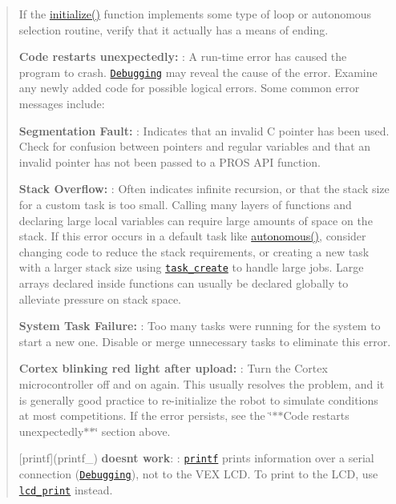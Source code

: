\begin{quote}
\begin{DoxyItemize}
If the {\ttfamily \hyperlink{main_8h_a9efe22aaead3a5e936b5df459de02eba}{initialize()}} function implements some type of loop or autonomous selection routine, verify that it actually has a means of ending.
\item {\bfseries Code restarts unexpectedly\+:} \+: A run-\/time error has caused the program to crash. \href{./debugging}{\tt Debugging} may reveal the cause of the error. Examine any newly added code for possible logical errors. Some common error messages include\+:
\begin{DoxyItemize}
\item {\bfseries Segmentation Fault\+:} \+: Indicates that an invalid C pointer has been used. Check for confusion between pointers and regular variables and that an invalid pointer has not been passed to a P\+R\+OS A\+PI function.
\item {\bfseries Stack Overflow\+:} \+: Often indicates infinite recursion, or that the stack size for a custom task is too small. Calling many layers of functions and declaring large local variables can require large amounts of space on the stack. If this error occurs in a default task like {\ttfamily \hyperlink{main_8h_a2df3d06bc5bced154da27fce393f991f}{autonomous()}}, consider changing code to reduce the stack requirements, or creating a new task with a larger stack size using \href{../../api/c/rtos.html#task_create}{\tt task\+\_\+create} to handle large jobs. Large arrays declared inside functions can usually be declared globally to alleviate pressure on stack space.
\item {\bfseries System Task Failure\+:} \+: Too many tasks were running for the system to start a new one. Disable or merge unnecessary tasks to eliminate this error.
\end{DoxyItemize}
\item {\bfseries Cortex blinking red light after upload\+:} \+: Turn the Cortex microcontroller off and on again. This usually resolves the problem, and it is generally good practice to re-\/initialize the robot to simulate conditions at most competitions. If the error persists, see the \char`\"{}$\ast$$\ast$\+Code restarts
        unexpectedly$\ast$$\ast$\char`\"{} section above.
\item \mbox{[}printf\mbox{]}(printf\+\_\+) {\bfseries doesn\textquotesingle{}t work}\+: \+: \href{http://www.cplusplus.com/reference/cstdio/printf/}{\tt printf} prints information over a serial connection (\href{../tutorials/general/debugging}{\tt Debugging}), not to the V\+EX L\+CD. To print to the L\+CD, use \href{../../api/c/llemu.html#lcd-print}{\tt lcd\+\_\+print} instead. 
\end{DoxyItemize}\end{quote}
